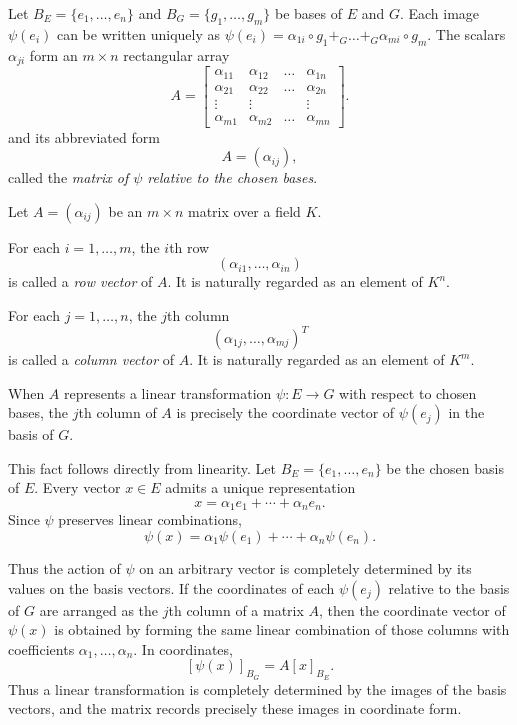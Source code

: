 \medskip

Let $B_E=\{e_1,\dots,e_n\}$ and $B_G=\{g_1,\dots,g_m\}$ be bases of $E$ and $G$. Each image $\psi(e_i)$ can be written uniquely as
\(
\psi(e_i) = \alpha_{1i} \circ g_1 +_G \dots +_G \alpha_{mi} \circ g_m.
\)
The scalars $\alpha_{ji}$ form an $m\times n$ rectangular array
\[
A =
\begin{bmatrix}
\alpha_{11} & \alpha_{12} & \dots & \alpha_{1n} \\
\alpha_{21} & \alpha_{22} & \dots & \alpha_{2n} \\
\vdots & \vdots & & \vdots \\
\alpha_{m1} & \alpha_{m2} & \dots & \alpha_{mn}
\end{bmatrix}.
\]
and its abbreviated form
\[
A=(\alpha_{ij}),
\]
called the \emph{matrix of $\psi$ relative to the chosen bases}.

\medskip

Let $A=(\alpha_{ij})$ be an $m \times n$ matrix over a field $K$.

For each $i=1,\dots,m$, the $i$th row
\[
(\alpha_{i1},\dots,\alpha_{in})
\]
is called a \textit{row vector} of $A$.
It is naturally regarded as an element of $K^n$.

For each $j=1,\dots,n$, the $j$th column
\[
(\alpha_{1j},\dots,\alpha_{mj})^T
\]
is called a \textit{column vector} of $A$.
It is naturally regarded as an element of $K^m$.

\medskip

When $A$ represents a linear transformation $\psi:E\to G$
with respect to chosen bases,
the $j$th column of $A$ is precisely the coordinate vector
of $\psi(e_j)$ in the basis of $G$.

\medskip

This fact follows directly from linearity.
Let $B_E=\{e_1,\dots,e_n\}$ be the chosen basis of $E$.
Every vector $x\in E$ admits a unique representation
\[
x=\alpha_1 e_1+\cdots+\alpha_n e_n.
\]
Since $\psi$ preserves linear combinations,
\[
\psi(x)=\alpha_1\psi(e_1)+\cdots+\alpha_n\psi(e_n).
\]

Thus the action of $\psi$ on an arbitrary vector is completely
determined by its values on the basis vectors.
If the coordinates of each $\psi(e_j)$ relative to the basis of $G$
are arranged as the $j$th column of a matrix $A$, then the coordinate
vector of $\psi(x)$ is obtained by forming the same linear combination
of those columns with coefficients $\alpha_1,\dots,\alpha_n$.
In coordinates,
\[
[\psi(x)]_{B_G}=A[x]_{B_E}.
\]
Thus a linear transformation is completely determined by the images
of the basis vectors, and the matrix records precisely these images
in coordinate form.

